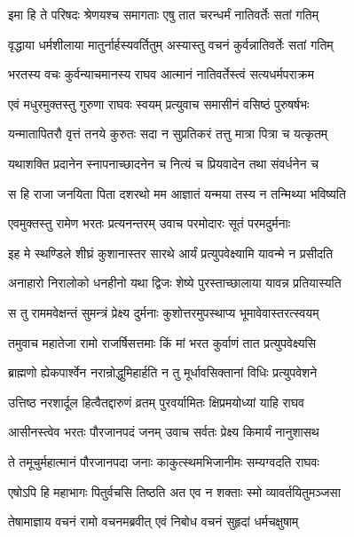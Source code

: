 \twolineshloka
{इमा हि ते परिषदः श्रेणयश्च समागताः}
{एषु तात चरन्धर्मं नातिवर्तेः सतां गतिम्} %

\twolineshloka
{वृद्धाया धर्मशीलाया मातुर्नार्हस्यवर्तितुम्}
{अस्यास्तु वचनं कुर्वन्नातिवर्तेः सतां गतिम्} %

\twolineshloka
{भरतस्य वचः कुर्वन्याचमानस्य राघव}
{आत्मानं नातिवर्तेस्त्वं सत्यधर्मपराक्रम} %

\twolineshloka
{एवं मधुरमुक्तस्तु गुरुणा राघवः स्वयम्}
{प्रत्युवाच समासीनं वसिष्ठं पुरुषर्षभः} %

\twolineshloka
{यन्मातापितरौ वृत्तं तनये कुरुतः सदा}
{न सुप्रतिकरं तत्तु मात्रा पित्रा च यत्कृतम्} %

\twolineshloka
{यथाशक्ति प्रदानेन स्नापनाच्छादनेन च}
{नित्यं च प्रियवादेन तथा संवर्धनेन च} %

\twolineshloka
{स हि राजा जनयिता पिता दशरथो मम}
{आज्ञातं यन्मया तस्य न तन्मिथ्या भविष्यति} %

\twolineshloka
{एवमुक्तस्तु रामेण भरतः प्रत्यनन्तरम्}
{उवाच परमोदारः सूतं परमदुर्मनाः} %

\twolineshloka
{इह मे स्थण्डिले शीघ्रं कुशानास्तर सारथे}
{आर्यं प्रत्युपवेक्ष्यामि यावन्मे न प्रसीदति} %

\twolineshloka
{अनाहारो निरालोको धनहीनो यथा द्विजः}
{शेष्ये पुरस्ताच्छालाया यावन्न प्रतियास्यति} %

\twolineshloka
{स तु राममवेक्षन्तं सुमन्त्रं प्रेक्ष्य दुर्मनाः}
{कुशोत्तरमुपस्थाप्य भूमावेवास्तरत्स्वयम्} %

\twolineshloka
{तमुवाच महातेजा रामो राजर्षिसत्तमाः}
{किं मां भरत कुर्वाणं तात प्रत्युपवेक्ष्यसि} %

\twolineshloka
{ब्राह्मणो ह्येकपार्श्वेन नरान्रोद्धुमिहार्हति}
{न तु मूर्धावसिक्तानां विधिः प्रत्युपवेशने} %

\twolineshloka
{उत्तिष्ठ नरशार्दूल हित्वैतद्दारुणं व्रतम्}
{पुरवर्यामितः क्षिप्रमयोध्यां याहि राघव} %

\twolineshloka
{आसीनस्त्वेव भरतः पौरजानपदं जनम्}
{उवाच सर्वतः प्रेक्ष्य किमार्यं नानुशासथ} %

\twolineshloka
{ते तमूचुर्महात्मानं पौरजानपदा जनाः}
{काकुत्स्थमभिजानीमः सम्यग्वदति राघवः} %

\twolineshloka
{एषोऽपि हि महाभागः पितुर्वचसि तिष्ठति}
{अत एव न शक्ताः स्मो व्यावर्तयितुमञ्जसा} %

\twolineshloka
{तेषामाज्ञाय वचनं रामो वचनमब्रवीत्}
{एवं निबोध वचनं सुहृदां धर्मचक्षुषाम्} %

